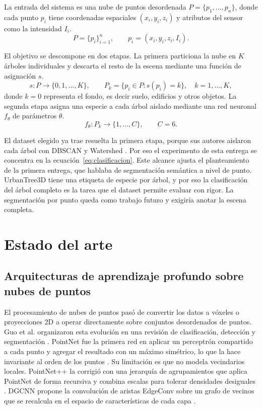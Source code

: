 \documentclass[preprint,12pt]{elsarticle}
\begin{document}
La entrada del sistema es una nube de puntos desordenada $P=\{p_1,\dots,p_n\}$, donde cada punto $p_i$ tiene coordenadas espaciales $(x_i,y_i,z_i)$ y atributos del sensor como la intensidad $I_i$.
\begin{equation}
P = \{p_i\}_{i=1}^{n}, \qquad p_i = (x_i, y_i, z_i, I_i).
\label{eq:pointcloud}
\end{equation}

El objetivo se descompone en dos etapas. La primera particiona la nube en $K$ árboles individuales y descarta el resto de la escena mediante una función de asignación $s$.
\begin{equation}
s : P \rightarrow \{0, 1, \dots, K\}, \qquad P_k = \{p_i \in P : s(p_i) = k\}, \quad k = 1, \dots, K,
\label{eq:instancias}
\end{equation}
donde $k=0$ representa el fondo, es decir suelo, edificios y otros objetos. La segunda etapa asigna una especie a cada árbol aislado mediante una red neuronal $f_\theta$ de parámetros $\theta$.
\begin{equation}
f_\theta : P_k \rightarrow \{1, \dots, C\}, \qquad C = 6.
\label{eq:clasificacion}
\end{equation}

El dataset elegido ya trae resuelta la primera etapa, porque sus autores aislaron cada árbol con DBSCAN y Watershed \cite{hamdani2026hybrid,hamdani2026urbantree3d}. Por eso el experimento de esta entrega se concentra en la ecuación~\eqref{eq:clasificacion}. Este alcance ajusta el planteamiento de la primera entrega, que hablaba de segmentación semántica a nivel de punto. UrbanTree3D tiene una etiqueta de especie por árbol, y por eso la clasificación del árbol completo es la tarea que el dataset permite evaluar con rigor. La segmentación por punto queda como trabajo futuro y exigiría anotar la escena completa.

\section{Estado del arte}
\label{sec:estado-arte}

\subsection{Arquitecturas de aprendizaje profundo sobre nubes de puntos}

El procesamiento de nubes de puntos pasó de convertir los datos a vóxeles o proyecciones 2D a operar directamente sobre conjuntos desordenados de puntos. Guo et al. organizaron esta evolución en una revisión de clasificación, detección y segmentación \cite{guo2021survey}. PointNet fue la primera red en aplicar un perceptrón compartido a cada punto y agregar el resultado con un máximo simétrico, lo que la hace invariante al orden de los puntos \cite{qi2017pointnet}. Su limitación es que no modela vecindarios locales. PointNet++ la corrigió con una jerarquía de agrupamientos que aplica PointNet de forma recursiva y combina escalas para tolerar densidades desiguales \cite{qi2017pointnetpp}. DGCNN propone la convolución de aristas EdgeConv sobre un grafo de vecinos que se recalcula en el espacio de características de cada capa \cite{wang2019dgcnn}.
\end{document}
